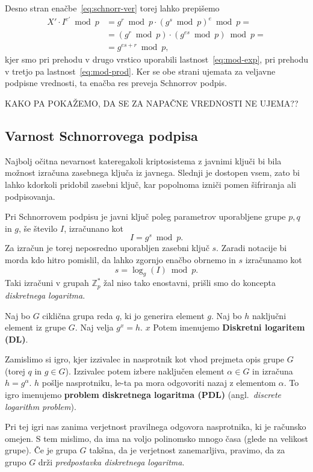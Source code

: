 \documentclass[isrm2, tisk]{fmfdelo}
\newcommand{\Z}{\mathbb Z}
\begin{document}
Desno stran enačbe~\eqref{eq:schnorr-ver} torej lahko prepišemo
\begin{align*}
X' \cdot I^{e'} \bmod p &= g^r \bmod p \cdot (g^s \bmod p)^e \bmod p = \\
                        &= (g^r \bmod p) \cdot (g^{es} \bmod p) \bmod p = \\ 
                        &= g^{es + r} \bmod p,
\end{align*}
kjer smo pri prehodu v drugo vrstico uporabili lastnost~\eqref{eq:mod-exp}, pri prehodu v tretjo 
pa lastnost~\eqref{eq:mod-prod}. Ker se obe strani ujemata za veljavne podpisne vrednosti, ta enačba 
res preveja Schnorrov podpis.

KAKO PA POKAŽEMO, DA SE ZA NAPAČNE VREDNOSTI NE UJEMA??

\subsection{Varnost Schnorrovega podpisa}
Najbolj očitna nevarnost kateregakoli kriptosistema z javnimi ključi bi bila možnost izračuna zasebnega 
ključa iz javnega. Slednji je dostopen vsem, zato bi lahko kdorkoli pridobil zasebni ključ, kar 
popolnoma izniči pomen šifriranja ali podpisovanja. 

Pri Schnorrovem podpisu je javni ključ poleg parametrov uporabljene grupe $p, q$ in $g$, še število 
$I$, izračunano kot 
$$ 
I = g^s \bmod p.
$$
Za izračun je torej neposredno uporabljen zasebni ključ $s$. Zaradi notacije bi morda kdo hitro pomislil, 
da lahko zgornjo enačbo obrnemo in $s$ izračunamo kot 
$$ 
s = \log_g(I) \bmod p.
$$
Taki izračuni v grupah $\Z_p^*$ žal niso tako enostavni, prišli smo do koncepta \textit{diskretnega 
logaritma}.

\begin{definicija}
    Naj bo $G$ ciklična grupa reda $q$, ki jo generira element $g$. Naj bo $h$ naključni element iz 
    grupe $G$. Naj velja $g^x = h$. $x$ Potem imenujemo \textbf{Diskretni logaritem (DL)}.

    Zamislimo si igro, kjer izzivalec in nasprotnik kot vhod prejmeta opis grupe $G$ (torej $q$ in 
    $g \in G$). Izzivalec potem izbere naključen element $\alpha \in G$ in izračuna $h = g^{\alpha}$.
    $h$ pošlje nasprotniku, le-ta pa mora odgovoriti nazaj z elementom $\alpha$. To igro imenujemo 
    \textbf{problem diskretnega logaritma (PDL)} (angl.\ \textit{discrete logarithm problem}).

    Pri tej igri nas zanima verjetnost pravilnega odgovora nasprotnika, ki je računsko omejen. S tem 
    mislimo, da ima na voljo polinomsko mnogo časa (glede na velikost grupe). Če je grupa $G$ takšna, 
    da je verjetnost zanemarljiva, pravimo, da za grupo $G$ drži \textit{predpostavka diskretnega 
    logaritma}.
\end{definicija}
\end{document}
